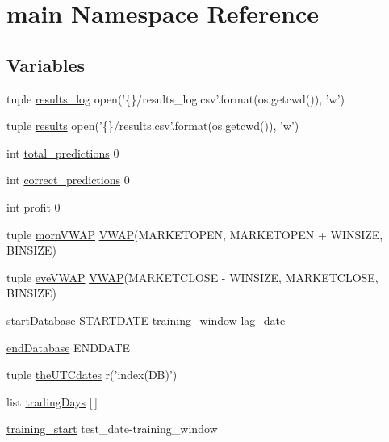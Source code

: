 \hypertarget{namespacemain}{\section{main Namespace Reference}
\label{namespacemain}
}
\subsection*{Variables}
\begin{DoxyCompactItemize}
\item 
tuple \hyperlink{namespacemain_a41cda8ca94e912c8abb2d5f880118cc4}{results\-\_\-log} open('\{\}/results\-\_\-log.\-csv'.format(os.\-getcwd()), 'w')
\item 
tuple \hyperlink{namespacemain_aebf74fc505cbd00f19e130b462531252}{results} open('\{\}/results.\-csv'.format(os.\-getcwd()), 'w')
\item 
int \hyperlink{namespacemain_a0796e61e25078d7fc619d17d9ef2016f}{total\-\_\-predictions} 0
\item 
int \hyperlink{namespacemain_af624554e0f6b710e1be0ba525c717b48}{correct\-\_\-predictions} 0
\item 
int \hyperlink{namespacemain_a71a9921366b31bec8dfbbdc963039a1a}{profit} 0
\item 
tuple \hyperlink{namespacemain_a11be7005c54d47daa509fba406aac63e}{morn\-V\-W\-A\-P} \hyperlink{classvwap_1_1_v_w_a_p}{V\-W\-A\-P}(M\-A\-R\-K\-E\-T\-O\-P\-E\-N, M\-A\-R\-K\-E\-T\-O\-P\-E\-N + W\-I\-N\-S\-I\-Z\-E, B\-I\-N\-S\-I\-Z\-E)
\item 
tuple \hyperlink{namespacemain_ab8560876136311d8e4a19ff8fc2cfeff}{eve\-V\-W\-A\-P} \hyperlink{classvwap_1_1_v_w_a_p}{V\-W\-A\-P}(M\-A\-R\-K\-E\-T\-C\-L\-O\-S\-E -\/ W\-I\-N\-S\-I\-Z\-E, M\-A\-R\-K\-E\-T\-C\-L\-O\-S\-E, B\-I\-N\-S\-I\-Z\-E)
\item 
\hyperlink{namespacemain_a7fa968fb4b6bd3982ff2852514448277}{start\-Database} S\-T\-A\-R\-T\-D\-A\-T\-E-\/training\-\_\-window-\/lag\-\_\-date
\item 
\hyperlink{namespacemain_a77925137ac37065898ded0ba59cec7c7}{end\-Database} E\-N\-D\-D\-A\-T\-E
\item 
tuple \hyperlink{namespacemain_af268f93db929575de02efc78bdbcb8dd}{the\-U\-T\-Cdates} r('index(D\-B)')
\item 
list \hyperlink{namespacemain_a2858a9cb8d47c2fac000edfd9eb5441f}{trading\-Days} \mbox{[}$\,$\mbox{]}
\item 
\hyperlink{namespacemain_a3109aa438d2ce6e6805dbce401dae70e}{training\-\_\-start} test\-\_\-date-\/training\-\_\-window

\end{DoxyCompactItemize}
